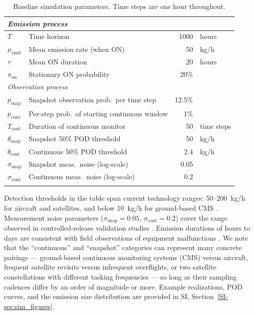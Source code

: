 \documentclass[numsec,webpdf,modern,mediumone]{oup-authoring-template}
\newcommand{\new}[1]{#1}
\newcommand{\edit}[1]{#1}
\begin{document}
\begin{table}[h]
\centering
\caption{Baseline simulation parameters. \new{Time steps are one hour throughout.}}
\label{tab:baseline_params}
\begin{tabular}{llrl}
\toprule
\multicolumn{4}{l}{\textit{Emission process}} \\
\midrule
$T$ & Time horizon & 1000 & hours \\
$\mu_{\text{emit}}$ & Mean emission rate (when ON) & 50 & kg/h \\
$\tau$ & Mean ON duration & 20 & hours \\
$\pi_{\text{on}}$ & Stationary ON probability & 20\% & \\
\midrule
\multicolumn{4}{l}{\textit{Observation process}} \\
\midrule
$p_{\text{snap}}$ & Snapshot observation prob.\ per time step & \edit{12.5\%} & \\
$p_{\text{cont}}$ & Per-step prob.\ of starting continuous window & 1\% & \\
$T_{\text{cont}}$ & Duration of continuous monitor & 50 & time steps \\
$\theta_{\text{snap}}$ & Snapshot 50\% POD threshold & 50 & kg/h \\
$\theta_{\text{cont}}$ & Continuous 50\% POD threshold & 2.4 & kg/h \\
$\sigma_{\text{snap}}$ & Snapshot meas.\ noise (log-scale) & 0.05 & \\
$\sigma_{\text{cont}}$ & Continuous meas.\ noise (log-scale) & 0.2 & \\
\botrule
\end{tabular}
\end{table}


\edit{Detection thresholds in the table span current technology ranges: 50--200~kg/h for aircraft and satellites, and below 10~kg/h for ground-based CMS \citep{chen2024comparing, Conrad2023, ElAbbadi2024, Sherwin2023}. Measurement noise parameters ($\sigma_{\text{snap}} = 0.05$, $\sigma_{\text{cont}} = 0.2$) cover the range observed in controlled-release validation studies \citep{Sherwin2021, Sherwin2023}. Emission durations of hours to days are consistent with field observations of equipment malfunctions \citep{Cusworth2021, Cusworth2026NatComms, Daniels2024}. We note that the ``continuous'' and ``snapshot'' categories can represent many concrete pairings — ground-based continuous monitoring systems (CMS) versus aircraft, frequent satellite revisits versus infrequent overflights, or two satellite constellations with different tasking frequencies — so long as their sampling cadences differ by an order of magnitude or more. Example realizations, POD curves, and the emission size distribution are provided in SI, Section~\ref{SI-sec:sim_figures}.}
\end{document}
